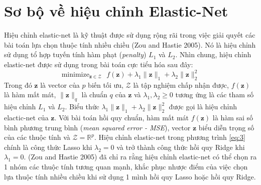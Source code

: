 \section{Sơ bộ về hiệu chỉnh Elastic-Net}
Hiệu chỉnh elastic-net là kỹ thuật được sử dụng rộng rãi trong việc giải quyết 
các bài toán lựa chọn thuộc tính nhiều chiều (Zou and Hastie 2005). Nó 
là hiệu chỉnh sử dụng tổ hợp tuyến tính hàm phạt (\textit{penalty})
$L_1$ và $L_2$. Nhìn chung, hiệu chỉnh elastic-net được sử dụng trong bài toán cực 
tiểu hóa sau đây:
\begin{equation}
    \label{eq:3}
    \text{minimize}_{\mathbf{z} \in \mathcal{Z}} \text{ }
    f(\mathbf{z}) + \lambda_1 \lVert \mathbf{z} \rVert_1
    + \lambda_2 \lVert \mathbf{z} \rVert_2^2
\end{equation}
Trong đó $\mathbf{z}$ là vector của $p$ biến tối ưu, $\mathcal{Z}$ là tập nghiệm 
chấp nhận được, $f(\mathbf{z})$ là hàm mất mát, $\lVert \mathbf{z} \rVert_q$ là 
chuẩn $q$ của $\mathbf{z}$ và $\lambda_1, \lambda_2 \geq 0$ tương ứng là các tham số hiệu 
chỉnh $L_1$ và $L_2$. Biểu thức $\lambda_1 \lVert \mathbf{z} \rVert_1 + \lambda_2 
\lVert \mathbf{z} \rVert_2^2$ được gọi là hiệu chỉnh elactic-net của $\mathbf{z}$.
Với bài toán hồi quy chuẩn, hàm mất mát $f(\mathbf{z})$ là hàm sai số bình phương trung bình
(\textit{mean squared error - MSE}), vector $\mathbf{z}$ biểu diễn trọng 
số của các thuộc tính và $\mathcal{Z} = \mathbb{R}^p$. Hiệu chỉnh elastic-net trong 
phương trình \ref{eq:3} chính là công thức Lasso khi $\lambda_2 = 0$ và trở thành công 
thức hồi quy Ridge khi $\lambda_1 = 0$. (Zou and Hastie 2005) đã chỉ ra rằng hiệu chỉnh 
elastic-net có thể chọn ra 1 nhóm các thuộc tính tương quan mạnh, khắc phục nhược điểm của việc chọn lựa thuộc tính nhiều chiều khi sử dụng 1 mình hồi quy Lasso 
hoặc hồi quy Ridge.